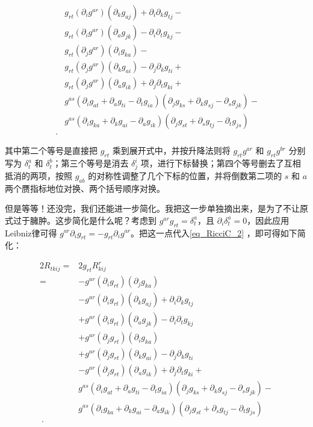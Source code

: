 \begin{equation}
\begin{aligned}
&g_{rt}(\partial_ig^{ar})(\partial_kg_{aj})+\partial_i\partial_kg_{tj}-\\
&g_{rt}(\partial_ig^{ar})(\partial_ag_{jk})-\partial_i\partial_tg_{kj}-\\%
&g_{rt}(\partial_jg^{ar})(\partial_ig_{ka})-\\
&g_{rt}(\partial_jg^{ar})(\partial_kg_{ai})-\partial_j\partial_kg_{ti}+\\
&g_{rt}(\partial_jg^{ar})(\partial_ag_{ik})+\partial_j\partial_tg_{ki}+\\%
&g^{as}(\partial_ig_{at}+\partial_ag_{ti}-\partial_tg_{ia})(\partial_jg_{ks}+\partial_kg_{sj}-\partial_sg_{jk})-\\
&g^{as}(\partial_ig_{ka}+\partial_kg_{ai}-\partial_ag_{ik})(\partial_jg_{st}+\partial_sg_{tj}-\partial_tg_{js})\\~.
\end{aligned}
\end{equation}

其中第二个等号是直接把 $g_{rt}$ 乘到展开式中，并按升降法则将 $g_{rt}g^{ar}$ 和 $g_{rt}g^{br}$ 分别写为 $\delta^a_t$ 和 $\delta^b_t$；第三个等号是消去 $\delta^i_j$ 项，进行下标替换；第四个等号删去了互相抵消的两项，按照 $g_{ab}$ 的对称性调整了几个下标的位置，并将倒数第二项的 $s$ 和 $a$ 两个赝指标地位对换、两个括号顺序对换。

但是等等！还没完，我们还能进一步简化。我把这一步单独摘出来，是为了不让原式过于臃肿。这步简化是什么呢？考虑到 $g^{ar}g_{rt}=\delta^a_t$，且 $\partial_i\delta^a_t=0$，因此应用Leibniz律可得 $g^{ar}\partial_ig_{rt}=-g_{rt}\partial_ig^{ar}$。把这一点代入\autoref{eq_RicciC_2} ，即可得如下简化：

\begin{equation}\label{eq_RicciC_3}
\begin{aligned}
2R_{tkij}={}&2g_{rt}R^r_{kij}\\
={}&-g^{ar}(\partial_ig_{rt})(\partial_jg_{ka})\\
&-g^{ar}(\partial_ig_{rt})(\partial_kg_{aj})+\partial_i\partial_kg_{tj}\\
&+g^{ar}(\partial_ig_{rt})(\partial_ag_{jk})-\partial_i\partial_tg_{kj}\\%
&+g^{ar}(\partial_jg_{rt})(\partial_ig_{ka})\\
&+g^{ar}(\partial_jg_{rt})(\partial_kg_{ai})-\partial_j\partial_kg_{ti}\\
&-g^{ar}(\partial_jg_{rt})(\partial_ag_{ik})+\partial_j\partial_tg_{ki}+\\%
&g^{as}(\partial_ig_{at}+\partial_ag_{ti}-\partial_tg_{ia})(\partial_jg_{ks}+\partial_kg_{sj}-\partial_sg_{jk})-\\
&g^{as}(\partial_ig_{ka}+\partial_kg_{ai}-\partial_ag_{ik})(\partial_jg_{st}+\partial_sg_{tj}-\partial_tg_{js})\\~.
\end{aligned}
\end{equation}




